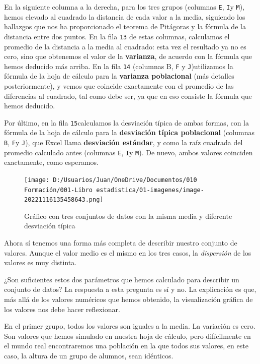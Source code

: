 \documentclass[
  letterpaper,
  DIV=11,
  numbers=noendperiod,
  oneside]{scrreprt}
\begin{document}
En la siguiente columna a la derecha, para los tres grupos (columnas
\texttt{E}, \texttt{I}y \texttt{M}), hemos elevado al cuadrado la
distancia de cada valor a la media, siguiendo los hallazgos que nos ha
proporcionado el teorema de Pitágoras y la fórmula de la distancia entre
dos puntos. En la fila \texttt{13} de estas columnas, calculamos el
promedio de la distancia a la media al cuadrado: esta vez el resultado
ya no es cero, sino que obtenemos el valor de la \textbf{varianza}, de
acuerdo con la fórmula que hemos deducido más arriba. En la fila
\texttt{14} (columnas B, \texttt{F} y \texttt{J})utilizamos la fórmula
de la hoja de cálculo para la \textbf{varianza poblacional} (más
detalles posteriormente), y vemos que coincide exactamente con el
promedio de las diferencias al cuadrado, tal como debe ser, ya que en
eso consiste la fórmula que hemos deducido.

Por último, en la fila \texttt{15}calculamos la desviación típica de
ambas formas, con la fórmula de la hoja de cálculo para la
\textbf{desviación típica poblacional} (columnas \texttt{B}, \texttt{F}y
\texttt{J}), que Excel llama \textbf{desviación estándar}, y como la
raíz cuadrada del promedio calculado antes (columnas \texttt{E},
\texttt{I}y \texttt{M}). De nuevo, ambos valores coinciden exactamente,
como esperamos.

\begin{figure}

{\centering \texttt{[image: D:/Usuarios/Juan/OneDrive/Documentos/010 Formación/001-Libro estadistica/01-imagenes/image-20221116135458643.png]}

}

\caption{Gráfico con tres conjuntos de datos con la misma media y
diferente desviación típica}

\end{figure}

Ahora sí tenemos una forma más completa de describir nuestro conjunto de
valores. Aunque el valor medio es el mismo en los tres casos, la
\emph{dispersión} de los valores es muy distinta.

¿Son suficientes estos dos parámetros que hemos calculado para describir
un conjunto de datos? La respuesta a esta pregunta es sí y no. La
explicación es que, más allá de los valores numéricos que hemos
obtenido, la visualización gráfica de los valores nos debe hacer
reflexionar.

En el primer grupo, todos los valores son iguales a la media. La
variación es cero. Son valores que hemos simulado en nuestra hoja de
cálculo, pero difícilmente en el mundo real encontraremos una población
en la que todos sus valores, en este caso, la altura de un grupo de
alumnos, sean idénticos.
\end{document}
